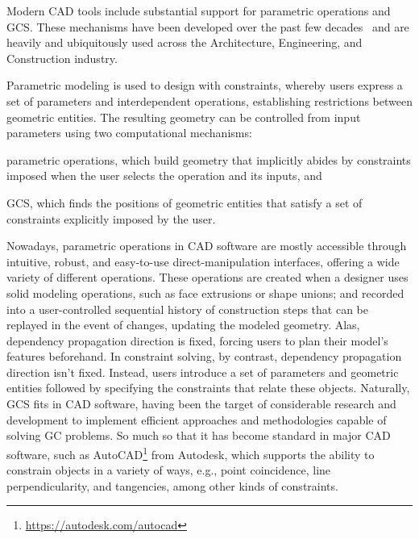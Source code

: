 %
\label{chap:intro}
\cleardoublepage{}

\noindent
Modern \ac{CAD} tools include substantial support for parametric operations and
\ac{GCS}.  These mechanisms have been developed over the past few
decades~\cite{Bettig:2011:GCSPC} and are heavily and ubiquitously used across
the Architecture, Engineering, and Construction industry.

Parametric modeling is used to design with constraints, whereby users express a
set of parameters and interdependent operations, establishing restrictions
between geometric entities.  The resulting geometry can be controlled from input
parameters using two computational mechanisms:
\begin{enumerate*}[label= (\arabic*)]
  \item parametric operations, which build geometry that implicitly abides by
  constraints imposed when the user selects the operation and its inputs, and
  \item \ac{GCS}, which finds the positions of geometric entities that satisfy a
  set of constraints explicitly imposed by the user.
\end{enumerate*}

Nowadays, parametric operations in \ac{CAD} software are mostly accessible
through intuitive, robust, and easy-to-use direct-manipulation interfaces,
offering a wide variety of different operations.  These operations are created
when a designer uses solid modeling operations, such as face extrusions or shape
unions; and recorded into a user-controlled sequential history of construction
steps that can be replayed in the event of changes, updating the modeled
geometry.  Alas, dependency propagation direction is fixed, forcing users to
plan their model's features beforehand.  In constraint solving, by contrast,
dependency propagation direction isn't fixed.  Instead, users introduce a set of
parameters and geometric entities followed by specifying the constraints that
relate these objects.  Naturally, \ac{GCS} fits in \ac{CAD} software, having
been the target of considerable research and development to implement efficient
approaches and methodologies capable of solving \ac{GC} problems.  So much so
that it has become standard in major \ac{CAD} software, such as
AutoCAD\footnote{\url{https://autodesk.com/autocad}} from Autodesk, which
supports the ability to constrain objects in a variety of ways, e.g., point
coincidence, line perpendicularity, and tangencies, among other kinds of
constraints.

